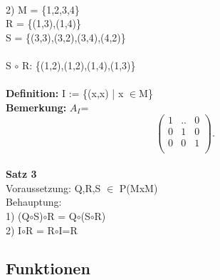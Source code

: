 \documentclass[11pt,a4paper]{article}
\begin{document}
\\
%
%
2) M = \{1,2,3,4\}\\
R = \{(1,3),(1,4)\}\\
S = \{(3,3),(3,2),(3,4),(4,2)\}\\
\\
%
%
S $\circ$ R: \{(1,2),(1,2),(1,4),(1,3)\}\\
%
%
\\
\textbf{Definition:} I := \{(x,x) | x $\in$M\}\\
\textbf{Bemerkung:} $A_{I}$= 
\[ \left(\begin{array}{ccc}
1 & .. & 0 \\
0 & 1 & 0\\
0 & 0 & 1\\
\end{array}\right).\]
\\
\textbf{Satz 3}\\
Voraussetzung: Q,R,S $\in$ P(MxM)\\
Behauptung:\\
1) (Q$\circ$S)$\circ$R = Q$\circ$(S$\circ$R)\\
2) I$\circ$R = R$\circ$I=R

\subsection{Funktionen}
\end{document}
